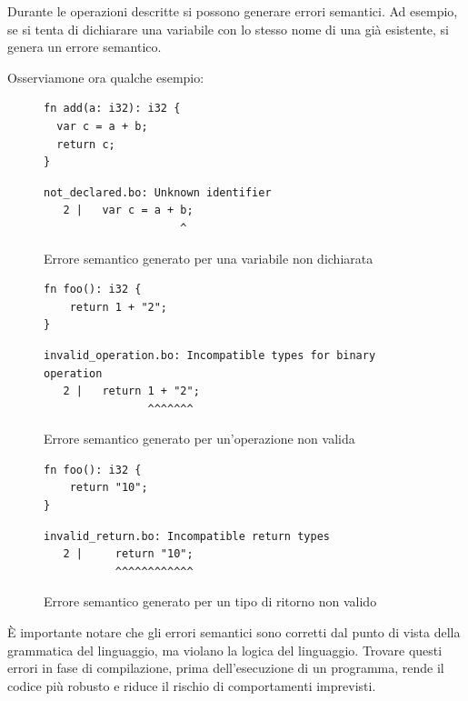 Durante le operazioni descritte si possono generare errori semantici. Ad esempio, se si tenta di dichiarare una variabile con lo stesso nome di una gi\`a esistente, si genera un errore semantico.

Osserviamone ora qualche esempio:
\begin{figure}[H]
	\centering
	\begin{verbatim}
fn add(a: i32): i32 {
  var c = a + b;
  return c;
}
	\end{verbatim}
	\begin{verbatim}
not_declared.bo: Unknown identifier
   2 |   var c = a + b;
                     ^
	\end{verbatim}
	\caption{Errore semantico generato per una variabile non dichiarata}
	\label{fig:unknown-identifier-error}
\end{figure}

\begin{figure}[H]
	\centering
	\begin{verbatim}
fn foo(): i32 {
	return 1 + "2";
}
	\end{verbatim}
	\begin{verbatim}
invalid_operation.bo: Incompatible types for binary operation
   2 |   return 1 + "2";
                ^^^^^^^
	\end{verbatim}
	\caption{Errore semantico generato per un'operazione non valida}
	\label{fig:invalid-binary-operation-error}
\end{figure}

\begin{figure}[H]
	\centering
	\begin{verbatim}
fn foo(): i32 {
	return "10";
}
	\end{verbatim}
	\begin{verbatim}
invalid_return.bo: Incompatible return types
   2 |     return "10";
           ^^^^^^^^^^^^
	\end{verbatim}
	\caption{Errore semantico generato per un tipo di ritorno non valido}
	\label{fig:invalid-return-type-error}
\end{figure}

\`E importante notare che gli errori semantici sono corretti dal punto di vista della grammatica del linguaggio, ma violano la logica del linguaggio. Trovare questi errori in fase di compilazione, prima dell'esecuzione di un programma, rende il codice pi\`u robusto e riduce il rischio di comportamenti imprevisti.

